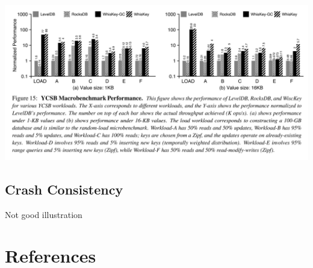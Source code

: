 \documentclass[11pt]{article}
\begin{document}
\begin{center}
\includegraphics[width=.99\textwidth]{../../images/db/21.png}
\label{}
\end{center}
\subsection{Crash Consistency}
\label{sec:org11bd409}
Not good illustration
\section{References}
\label{sec:orgcf4ebd5}
\label{bibliographystyle link}


\label{bibliography link}

\end{document}
